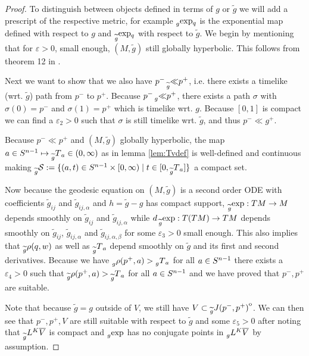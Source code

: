 \begin{proof}
    To distinguish between objects defined in terms of $g$ or $\widetilde{g}$ we will add a prescript of the respective metric, for example $\prescript{}{g}{\exp}_q$ is the exponential map defined with respect to $g$ and $\prescript{}{\widetilde{g}}{\exp}_q$ with respect to $\widetilde{g}$. We begin by mentioning that for $\varepsilon>0$, small enough, $(M,\widetilde{g})$ still globally hyperbolic. This follows from theorem 12 in \cite{gerochdomain}.
    
    Next we want to show that we also have $p^- \prescript{}{\widetilde{g}}{\ll} p^+$, i.e. there exists a timelike (wrt. $\widetilde{g}$) path from 
    $p^-$ to $p^+$. Because $p^- \prescript{}{g}{\ll} p^+$, there exists a path $\sigma$ with $\sigma(0)=p^-$ and $\sigma(1)=p^+$ which is timelike wrt. $g$. Because $[0,1]$ is compact we can find a $\varepsilon_2>0$ such that $\sigma$ is still timelike wrt. $\widetilde{g}$, and thus $p^-\ll g^+$.

    Because $p^-\ll p^+$ and $(M,\widetilde{g})$ globally hyperbolic, the map $a\in {S^{n-1}} \mapsto \prescript{}{\widetilde{g}}{T}_a\in (0,\infty)$ as in lemma \ref{lem:Tvdef} is well-defined and continuous making $\prescript{}{\widetilde{g}}{{\mathcal{S}}} := \{(a,t)\in {S^{n-1}}\times [0,\infty) \mid t\in [0,\prescript{}{\widetilde{g}}{T}_a]\}$ a compact set. 

    Now because the geodesic equation on $(M,\widetilde{g})$ is a second order ODE with coefficients $\widetilde{g}_{ij}$ and $\widetilde{g}_{ij,\alpha}$ and $h=\widetilde{g}-g$ has compact support, $\prescript{}{\widetilde{g}}{\exp}:TM\to M$ depends smoothly on $\widetilde{g}_{ij}$ and $\widetilde{g}_{ij,\alpha}$ while $d\prescript{}{\widetilde{g}}{\exp}:T(TM)\to TM$ depends smoothly on $\widetilde{g}_{ij}$, $\widetilde{g}_{ij,\alpha}$ and $\widetilde{g}_{ij,\alpha,\beta}$ for some $\varepsilon_3>0$ small enough. This also implies that $\prescript{}{\widetilde{g}}{\rho(q,w)}$ as well as $\prescript{}{\widetilde{g}}{T}_a$ depend smoothly on $\widetilde{g}$ and its first and second derivatives. Because we have $\prescript{}{g}{\rho(p^+,a)}>\prescript{}{g}{T}_a$ for all $a\in {S^{n-1}}$ there exists a $\varepsilon_4>0$ such that $\prescript{}{\widetilde{g}}{\rho(p^+,a)}>\prescript{}{\widetilde{g}}{T}_a$ for all $a\in {S^{n-1}}$ and we have proved that $p^-,p^+$ are suitable.

    Note that because $\widetilde{g}=g$ outside of $V$, we still have $V\subset {\kern0pt\prescript{}{\widetilde{g}}{J(p^-,p^+)}}^{\mathrm{o}}$. We can then see that $p^-,p^+,V$ are still suitable with respect to $\widetilde{g}$ and some $\varepsilon_5>0$ after noting that $\prescript{}{\widetilde{g}}{L}^K{\overline{V}}$ is compact and $\prescript{}{g}{\exp}$ has no conjugate points in $\prescript{}{g}{L}^K{\overline{V}}$ by assumption.
\end{proof}

